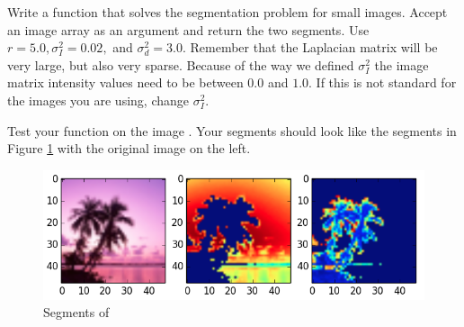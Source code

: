 \begin{problem}  Write a function  that solves the segmentation problem for small images.
Accept an image array as an argument and return the two segments.
Use $r = 5.0, \sigma_I^2 = 0.02,$ and $\sigma_d^2 = 3.0$.
Remember that the Laplacian matrix will be very large, but also very sparse.
Because of the way we defined $\sigma_I^2$ the image matrix intensity values need to be between $0.0$ and $1.0$. If this is not standard for the images you are using, change $\sigma_I^2$.

Test your function on the image . Your segments should look like the segments in Figure \ref{fig:dream_solution} with the original image on the left.
\end{problem}

\begin{figure}
\centering
\includegraphics[width=\textwidth]{dream_solution.png}
\caption{Segments of }
\label{fig:dream_solution}
\end{figure}